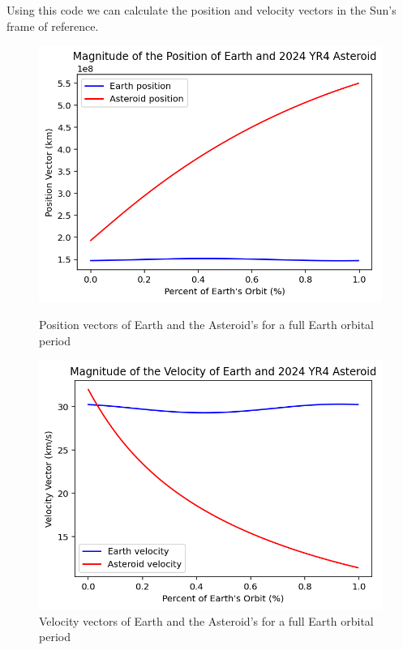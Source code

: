 \documentclass[a4paper, 12pt]{article}  %
\begin{document}
\noindent Using this code we can calculate the position and velocity vectors in the Sun's frame of reference. 

\begin{figure}[H]
    \centering
    \begin{minipage}{0.48\textwidth}
        \centering
        \includegraphics[width=\textwidth]{Images/114-pos.png}
        \caption{Position vectors of Earth and the Asteroid's for a full Earth orbital period}
        \label{fig:pos}
    \end{minipage}
    \hfill
    \begin{minipage}{0.48\textwidth}
        \centering
        \includegraphics[width=\textwidth]{Images/114-vel.png}
        \caption{Velocity vectors of Earth and the Asteroid's for a full Earth orbital period}
        \label{fig:vel}
    \end{minipage}
\end{figure}
\end{document}
